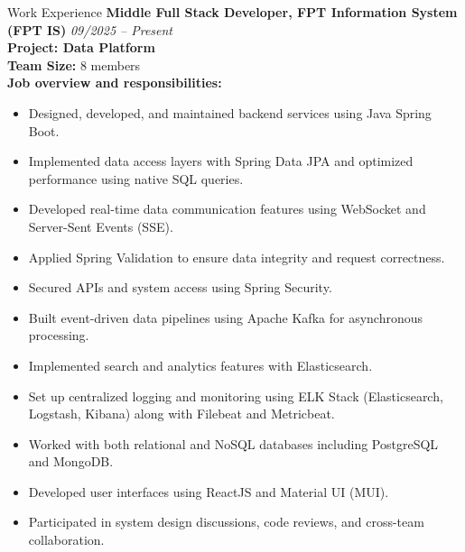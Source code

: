 \documentclass{resume} %
\begin{document}
\begin{rSection}{Work Experience}
{\bf Middle Full Stack Developer, FPT Information System (FPT IS)} \hfill {\em 09/2025 – Present}
\\ \textbf{Project: Data Platform}
\\ \textbf{Team Size:} 8 members
\\ \textbf{Job overview and responsibilities:}
\begin{itemize}
    \item Designed, developed, and maintained backend services using Java Spring Boot.
    \item Implemented data access layers with Spring Data JPA and optimized performance using native SQL queries.
    \item Developed real-time data communication features using WebSocket and Server-Sent Events (SSE).
    \item Applied Spring Validation to ensure data integrity and request correctness.
    \item Secured APIs and system access using Spring Security.
    \item Built event-driven data pipelines using Apache Kafka for asynchronous processing.
    \item Implemented search and analytics features with Elasticsearch.
    \item Set up centralized logging and monitoring using ELK Stack (Elasticsearch, Logstash, Kibana) along with Filebeat and Metricbeat.
    \item Worked with both relational and NoSQL databases including PostgreSQL and MongoDB.
    \item Developed user interfaces using ReactJS and Material UI (MUI).
    \item Participated in system design discussions, code reviews, and cross-team collaboration.
\end{itemize}


\end{rSection}
\end{document}

